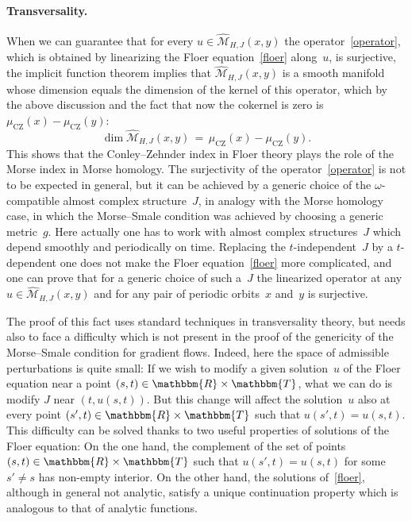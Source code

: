 \documentclass[12pt,twoside]{amsart}
\theoremstyle{plain}
\numberwithin{figure}{section}
\numberwithin{equation}{section}
\def\sCZ{ {\scriptscriptstyle\operatorname{CZ}}}
\def\cm{{\mathcal M}}
\def\RR{\mathbbm{R}}
\def\TT{\mathbbm{T}}
\begin{document}
\paragraph{\bf Transversality.} 
When we can guarantee that for every $u \in \widehat{\cm}_{H,J}(x,y)$ the operator~\eqref{operator}, 
which is obtained by linearizing the Floer equation~\eqref{floer} along~$u$, is surjective, 
the implicit function theorem implies that $\widehat{\cm}_{H,J}(x,y)$ is a smooth manifold 
whose dimension equals the dimension of the kernel of this operator, which by the above discussion 
and the fact that now the cokernel is zero is $\mu_{\sCZ}(x) - \mu_{\sCZ}(y)$:
\[
\dim \widehat{\cm}_{H,J}(x,y) \,=\, \mu_{\sCZ}(x) - \mu_{\sCZ}(y).
\]
This shows that the Conley--Zehnder index in Floer theory plays the role of the Morse index in Morse homology. The surjectivity of the operator~\eqref{operator} is not to be expected in general, 
but it can be achieved by a generic choice of the $\omega$-compatible almost complex structure~$J$, 
in analogy with the Morse homology case, in which the Morse--Smale condition was achieved 
by choosing a generic metric~$g$. Here actually one has to work with almost complex structures~$J$ 
which depend smoothly and periodically on time. Replacing the $t$-independent~$J$ by a $t$-dependent one 
does not make the Floer equation~\eqref{floer} more complicated, and one can prove that for a generic choice of such a~$J$ the linearized operator at any $u \in \widehat{\cm}_{H,J}(x,y)$ and for any pair of periodic orbits~$x$ and~$y$ is surjective.

The proof of this fact uses standard techniques in transversality theory, but needs also to face 
a difficulty which is not present in the proof of the genericity of the Morse--Smale condition for 
gradient flows. Indeed, here the space of admissible perturbations is quite small: 
If we wish to modify a given solution~$u$ of the Floer equation near a point $(s,t) \in \RR \times \TT$, 
what we can do is modify $J$ near $(t,u(s,t))$. But this change will affect the solution~$u$ also at every point $(s',t) \in \RR \times \TT$ such that $u(s',t)=u(s,t)$. 
This difficulty can be solved thanks to two useful properties of solutions of the Floer equation: 
On the one hand, the complement of the set of points $(s,t) \in \RR \times \TT$ such that $u(s',t)=u(s,t)$ for some $s'\neq s$ has non-empty interior. On the other hand, the solutions of~\eqref{floer}, 
although in general not analytic, satisfy a unique continuation property which is analogous to that of analytic functions. 
\end{document}
